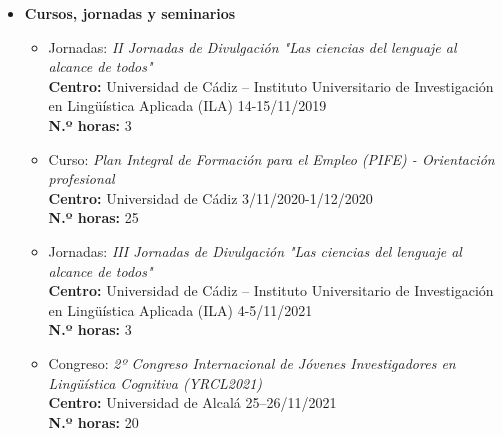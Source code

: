 \begin{enumerate}[label=\alph*)]
\begin{itemize}
\begin{itemize}[label=\textbullet]
  \item \textit{Textos científicos con LaTeX en Overleaf}\\
  \textbf{Centro:} Universidad de Cádiz\\
  \textbf{Fecha de finalización:} 09/02/2024\\
  \textbf{N.º horas:} 25

  \item \textit{Excel nivel intermedio. Curso teórico/práctico}\\
  \textbf{Centro:} Universidad de Cádiz\\
  \textbf{Fecha de finalización:} 23/02/2024\\
  \textbf{N.º horas:} 25

  \item \textit{Genera el futuro: aprendiendo inteligencia artificial generativa}\\
  \textbf{Centro:} Universidad de Cádiz\\
  \textbf{Fecha de finalización:} 26/05/2024\\
  \textbf{N.º horas:} 25
  \end{itemize}

\item \textbf{Cursos, jornadas y seminarios}
  \begin{itemize}[label=\textbullet]
    \item Jornadas: \textit{II Jornadas de Divulgación "Las ciencias del
lenguaje al alcance de todos"}\\
  \textbf{Centro:} Universidad de Cádiz – Instituto Universitario de Investigación en Lingüística Aplicada (ILA)
  \hfill 14-15/11/2019\\
  \textbf{N.º horas:} 3
    
    \item Curso: \textit{Plan Integral de Formación para el Empleo (PIFE) - Orientación profesional}\\
  \textbf{Centro:} Universidad de Cádiz
  \hfill 3/11/2020-1/12/2020\\
  \textbf{N.º horas:} 25

    \item Jornadas: \textit{III Jornadas de Divulgación "Las ciencias del
lenguaje al alcance de todos"}\\
  \textbf{Centro:} Universidad de Cádiz – Instituto Universitario de Investigación en Lingüística Aplicada (ILA)
  \hfill 4-5/11/2021\\
  \textbf{N.º horas:} 3
    
    \item Congreso: \textit{2º Congreso Internacional de Jóvenes Investigadores en Lingüística Cognitiva (YRCL2021)}\\
  \textbf{Centro:} Universidad de Alcalá
  \hfill 25–26/11/2021\\
  \textbf{N.º horas:} 20


\end{itemize}
\end{itemize}
\end{enumerate}
